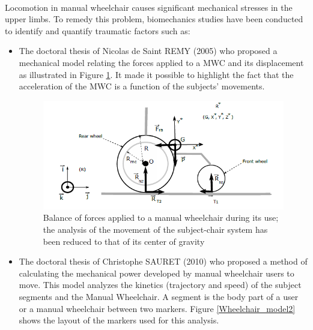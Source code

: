 \paragraph{}Locomotion in manual wheelchair causes significant mechanical stresses in the upper limbs. To remedy this problem, biomechanics studies have been conducted to identify and quantify traumatic factors such as:
\begin{itemize}
\item The doctoral thesis of Nicolas de Saint REMY (2005) \cite{Remy2005} who proposed a
mechanical model relating the forces applied to a MWC and its displacement as illustrated in Figure \ref{Wheelchair_model}. It made it possible to highlight the fact that the acceleration of the MWC is a function of the subjects' movements.

\begin{figure}[h]
\center
\includegraphics[scale = 0.6]{images/wheelchair_model2}
\caption{Balance of forces applied to a manual wheelchair during its use; the analysis of the movement of the subject-chair system has been reduced to that of its center of gravity \cite{Remy2005}}
\label{Wheelchair_model}
\end{figure}

\item The doctoral thesis of Christophe SAURET (2010) \cite{Sauret2010} who proposed a method of calculating the mechanical power developed by manual wheelchair users to move. This model analyzes the kinetics (trajectory and speed) of the subject segments and the Manual Wheelchair. A segment is the body part of a user or a manual wheelchair between two markers. Figure \ref{Wheelchair_model2} shows the layout of the markers used for this analysis.


\end{itemize}
